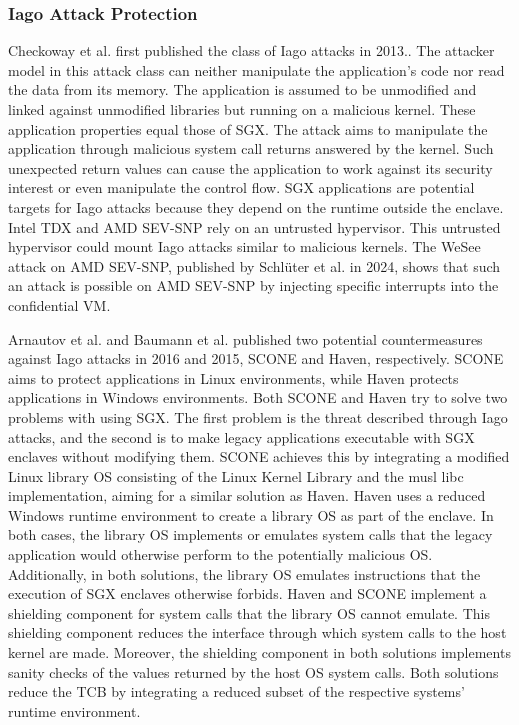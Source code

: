 \subsubsection{Iago Attack Protection}
\label{sec:20:iago}
Checkoway et al. first published the class of Iago attacks in 2013.\cite{checkoway2013iago}. The attacker model in this
attack class can neither manipulate the application's code nor read the data from its memory. The
application is assumed to be unmodified and linked against unmodified libraries but running on a malicious kernel.
These application properties equal those of SGX. The attack aims to manipulate the application through
malicious system call returns answered by the kernel. Such unexpected return values can cause the application to work
against its security interest or even manipulate the control flow.
SGX applications are potential targets for Iago attacks because they depend on the runtime outside the
enclave. Intel TDX and AMD SEV-SNP rely on an untrusted hypervisor.\cite{tdx_whitepaper,kaplan_amd_2020}
This untrusted hypervisor could mount Iago attacks similar to malicious kernels. The WeSee attack on
AMD SEV-SNP, published by Schlüter et al. in 2024, shows that such an attack is possible on AMD SEV-SNP by
injecting specific interrupts into the confidential VM.\cite{schluter2024wesee}

Arnautov et al. and Baumann et al. published two potential countermeasures against Iago attacks in 2016 and 2015,
SCONE and Haven, respectively. SCONE aims to protect applications in Linux environments, while Haven protects
applications in Windows environments.\cite{arnautov_scone_2016, baumann_shielding_2015}
Both SCONE and Haven try to solve two problems with using SGX. The first problem is the threat described through Iago
attacks, and the second is to make legacy applications executable with SGX enclaves without
modifying them. SCONE achieves this by integrating a modified Linux library OS consisting of the Linux Kernel Library
and the musl libc implementation, aiming for a similar solution as Haven. Haven uses a reduced Windows runtime
environment to create a library OS as part of the enclave. In both cases, the library OS implements or emulates system
calls that the legacy application would otherwise perform to the potentially malicious OS. Additionally, in both
solutions, the library OS emulates instructions that the execution of SGX enclaves otherwise forbids. Haven and SCONE
implement a shielding component for system calls that the library OS cannot emulate. This shielding component
reduces the interface through which system calls to the host kernel are made. Moreover, the shielding component in both
solutions implements sanity checks of the values returned by the host OS system calls. Both solutions reduce the TCB by
integrating a reduced subset of the respective systems' runtime environment.

